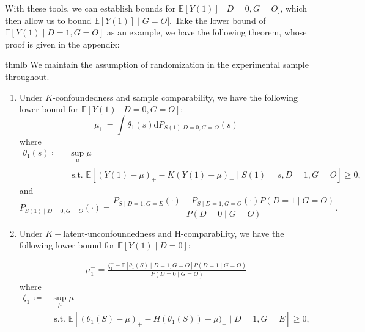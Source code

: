 \documentclass[12pt]{article}
\newcommand{\Ep}{\mathbb{E}}
\begin{document}
	With these tools, we can establish bounds for $\Ep[Y(1)] \mid D = 0, G = O]$, which then allow us to bound $\Ep[Y(1)] \mid G = O]$. Take the lower bound of $\Ep[Y(1) \mid D= 1, G = O]$ as an example, we have the following theorem, whose proof is given in the appendix:
	\begin{restatable}[Lower Bound on $\Ep(Y(1) \mid D = 0, G = O)$]{thm}{lb}\label{thm:thm2}
		We maintain the assumption of randomization  in the experimental sample throughout.
		\begin{enumerate}[label=(\alph*)]
			\item Under $K$-confoundedness and sample comparability, we have the following lower bound for $\Ep[Y(1) \mid D = 0, G = O]$:
			$$\mu^-_1 = \int \theta_1(s) \mathrm{d} P_{S(1) | D = 0, G = O}(s)$$ where 
			\begin{equation}\label{eq:eq1}
			\begin{array}{ll}
			\theta_1(s) \coloneqq & \sup _{\mu}  \mu \\
			& \text { s.t. }  \mathbb{E}\left[(Y(1)-\mu)_{+}-K(Y(1)-\mu)_{-} \mid S(1)=s, D=1, G = O\right] \geq 0,
			\end{array}
			\end{equation}
			and 
			\begin{equation}\label{eq:eq2}
			P_{S(1) \mid D = 0, G = O} (\cdot) = \frac{P_{S \mid D = 1, G = E}(\cdot) - P_{S \mid D = 1, G = O} (\cdot) P(D = 1 \mid G = O) }{P(D = 0 \mid G = O)}.    
			\end{equation}
			
			
			\item Under $K-$latent-unconfoundedness and H-comparability, we have the following lower bound for $\Ep[Y(1) \mid D = 0]$:
			
			\begin{equation}\label{eq:eq3}
			\begin{array}{ll}
			\mu_1^- =  \frac{\zeta_1^- - \Ep[\theta_1(S) \mid D=1, G=O] P(D=1\mid G=O)}{P(D = 0 \mid G = O)}
			\end{array}
			\end{equation}
			where 
			\begin{equation}\label{eq:eq4}
			\begin{array}{ll}
			\zeta_1^- \coloneqq & \sup _{\mu}  \mu \\
			& \text { s.t. }  \mathbb{E}\left[(\theta_1(S)-\mu)_{+}-H(\theta_1(S))-\mu)_{-} \mid D=1, G = E\right] \geq 0,
			\end{array}
			\end{equation}
			
		\end{enumerate}
	\end{restatable}
	
\end{document}
